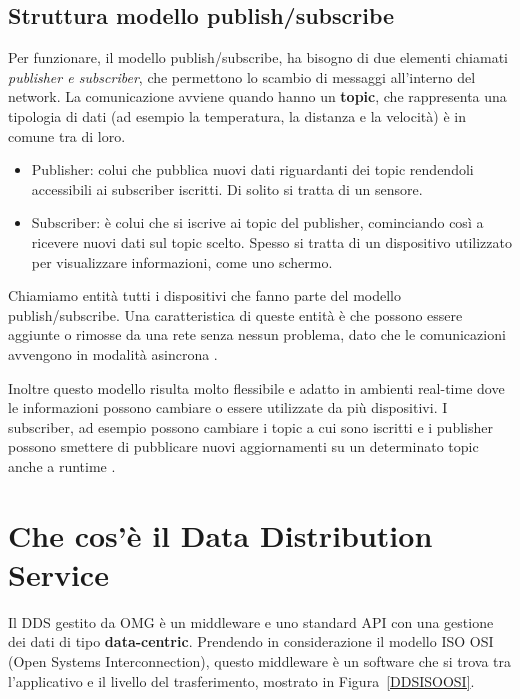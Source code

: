 \subsection{Struttura modello publish/subscribe}
Per funzionare, il modello publish/subscribe, ha bisogno di
due elementi chiamati \textit{publisher e subscriber}, 
che permettono lo scambio di messaggi all'interno del network.
La comunicazione avviene 
quando hanno un \textbf{topic}, che
rappresenta una tipologia di dati (ad esempio la temperatura, 
la distanza e la velocità) è in comune tra di loro.
\begin{itemize}
    \item Publisher: colui che pubblica nuovi dati riguardanti dei
    topic rendendoli accessibili ai subscriber iscritti. 
    Di solito si tratta di un sensore.
    \item Subscriber: è colui che si iscrive ai topic del publisher, 
    cominciando
    così a ricevere nuovi dati sul topic scelto. Spesso si tratta
    di un dispositivo utilizzato per visualizzare informazioni, come uno
    schermo.
\end{itemize}
Chiamiamo entità tutti i dispositivi che fanno parte del modello 
publish/subscribe.
Una caratteristica di queste entità è che possono essere aggiunte o rimosse
da una rete senza nessun problema, dato che le 
comunicazioni avvengono in modalità asincrona \cite{dds1.4}. 

Inoltre questo modello risulta molto
flessibile e adatto in ambienti real-time dove le informazioni
possono cambiare o essere utilizzate da più dispositivi.
I subscriber, ad esempio possono cambiare i topic a cui 
sono iscritti e i publisher possono smettere di pubblicare nuovi
aggiornamenti su un determinato topic anche a runtime \cite{OH2010318}.
\label{publish/subscribe}

\section{Che cos'è il Data Distribution Service}

Il DDS gestito da OMG è un middleware e uno standard API con una gestione
dei dati di tipo \textbf{data-centric}. 
Prendendo in considerazione il modello ISO OSI 
(Open Systems Interconnection), questo
middleware è un software che si trova tra l'applicativo e il livello
del trasferimento, mostrato in Figura~\ref{DDSISOOSI}.

